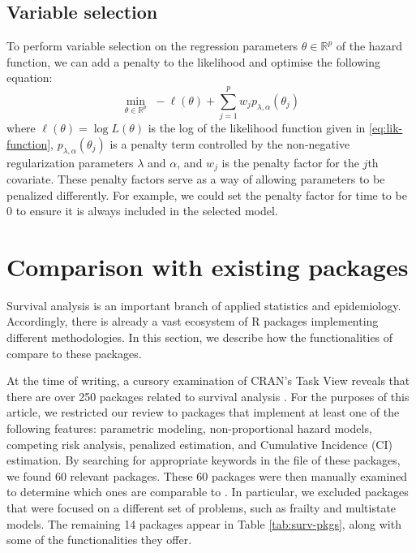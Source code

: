 \hypertarget{variable-selection}{%
\subsection{Variable selection}\label{variable-selection}}

To perform variable selection on the regression parameters
\(\theta \in \mathbb{R}^p\) of the hazard function, we can add a penalty
to the likelihood and optimise the following equation: \begin{equation}
\min _{\theta \in \mathbb{R}^{p}}\,\,-\ell\left(\theta\right)+\sum_{j=1}^p w_j p_{\lambda,\alpha}(\theta_j) \label{eq:penest}
\end{equation} where \(\ell\left(\theta\right) = \log L(\theta)\) is the
log of the likelihood function given in \eqref{eq:lik-function},
\(p_{\lambda,\alpha}(\theta_j)\) is a penalty term controlled by the
non-negative regularization parameters \(\lambda\) and \(\alpha\), and
\(w_j\) is the penalty factor for the \(j\)th covariate. These penalty
factors serve as a way of allowing parameters to be penalized
differently. For example, we could set the penalty factor for time to be
0 to ensure it is always included in the selected model.

\hypertarget{comparison-with-existing-packages}{%
\section{Comparison with existing
packages}\label{comparison-with-existing-packages}}

Survival analysis is an important branch of applied statistics and
epidemiology. Accordingly, there is already a vast ecosystem of R
packages implementing different methodologies. In this section, we
describe how the functionalities of  compare to these
packages.

At the time of writing, a cursory examination of CRAN's 
Task View reveals that there are over 250 packages related to survival
analysis \citep{survTaskView}. For the purposes of this article, we
restricted our review to packages that implement at least one of the
following features: parametric modeling, non-proportional hazard models,
competing risk analysis, penalized estimation, and Cumulative Incidence
(CI) estimation. By searching for appropriate keywords in the
 file of these packages, we found 60 relevant
packages. These 60 packages were then manually examined to determine
which ones are comparable to . In particular, we excluded
packages that were focused on a different set of problems, such as
frailty and multistate models. The remaining 14 packages appear in Table
\ref{tab:surv-pkgs}, along with some of the functionalities they offer.

